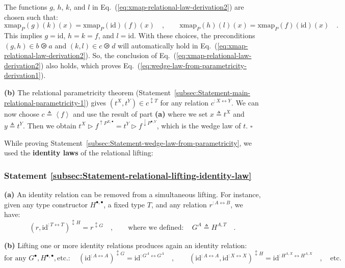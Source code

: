 The functions $g$, $h$, $k$, and $l$ in Eq.~(\ref{eq:xmap-relational-law-derivation2})
are chosen such that:
\[
\text{xmap}_{P}(g)(k)(x)=\text{xmap}_{P}(\text{id})(f)(x)\quad,\quad\quad\text{xmap}_{P}(h)(l)(x)=\text{xmap}_{P}(f)(\text{id})(x)\quad.
\]
This implies $g=\text{id}$, $h=k=f$, and $l=\text{id}$. With these
choices, the preconditions $(g,h)\in b\ogreaterthan a$ and $(k,l)\in c\ogreaterthan d$
will automatically hold in Eq.~(\ref{eq:xmap-relational-law-derivation2}).
So, the conclusion of Eq.~(\ref{eq:xmap-relational-law-derivation2})
also holds, which proves Eq.~(\ref{eq:wedge-law-from-parametricity-derivation1}). 

\textbf{(b)} The relational parametricity theorem (Statement~\ref{subsec:Statement-main-relational-parametricity-1})
gives $(t^{X},t^{Y})\in c^{\updownarrow T}$ for any relation $c^{:X\leftrightarrow Y}$.
We can now choose $c\triangleq\left<f\right>$ and use the result
of part \textbf{(a)} where we set $x\triangleq t^{X}$ and $y\triangleq t^{Y}$.
Then we obtain $t^{X}\triangleright f^{\uparrow P^{X,\bullet}}=t^{Y}\triangleright f^{\downarrow P^{\bullet,Y}}$,
which is the wedge law of $t$. $\square$

While proving Statement~\ref{subsec:Statement-wedge-law-from-parametricity},
we used the \textbf{identity laws}
of the relational lifting:

\subsubsection{Statement \label{subsec:Statement-relational-lifting-identity-law}\ref{subsec:Statement-relational-lifting-identity-law}}

\textbf{(a)} An identity relation can be removed from a simultaneous
lifting. For instance, given any type constructor $H^{\bullet,\bullet}$,
a fixed type $T$, and any relation $r^{:A\leftrightarrow B}$, we
have: 
\[
(r,\text{id}^{:T\leftrightarrow T})^{\updownarrow H}=r^{\updownarrow G}\quad,\quad\quad\text{where we defined}:\quad G^{A}\triangleq H^{A,T}\quad.
\]

\textbf{(b)} Lifting one or more identity relations produces again
an identity relation: 
\[
\text{for any }G^{\bullet},H^{\bullet,\bullet},\text{etc}.:\quad(\text{id}^{:A\leftrightarrow A})^{\updownarrow G}=\text{id}^{:G^{A}\leftrightarrow G^{A}}\quad,\quad\quad(\text{id}^{:A\leftrightarrow A},\text{id}^{:X\leftrightarrow X})^{\updownarrow H}=\text{id}^{:H^{A,X}\leftrightarrow H^{A,X}}\quad,\quad\text{etc}.
\]


